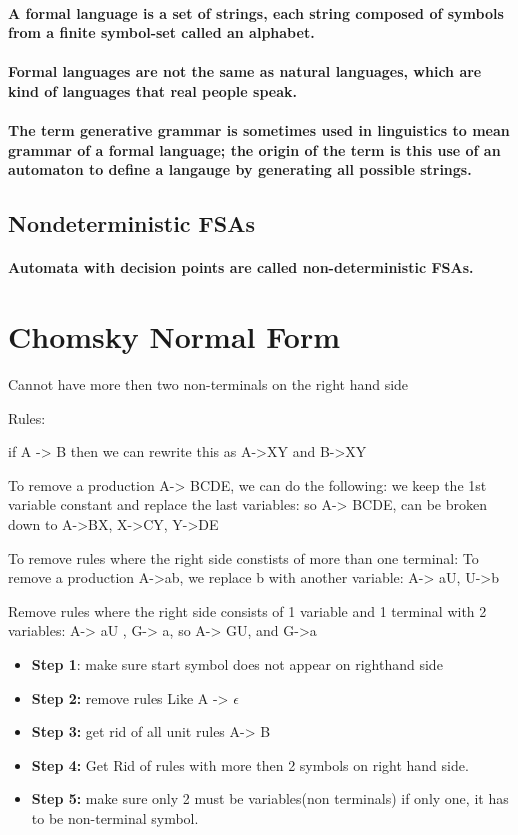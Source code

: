 \documentclass[a4paper]{article}
\begin{document}
\paragraph{A \textbf{formal language} is a set of strings, each string composed of symbols from a finite symbol-set called an \textbf{alphabet}. }
\paragraph{Formal languages are not the same as \textbf{natural languages}, which are kind of languages that real people speak. }
\paragraph{The term \textbf{generative grammar }is sometimes used in linguistics to mean grammar of a formal language; the origin of the term is this use of an automaton to define a langauge by generating all possible strings. }
\subsection{Nondeterministic FSAs}
\paragraph{Automata with decision points are called \textbf{non-deterministic FSAs}. }


\section{Chomsky Normal Form}
\par{Cannot have more then two non-terminals on the right hand side}
\par{Rules:}
\par{if A -> B then we can rewrite this as A->XY and B->XY}
\par{To remove a production A-> BCDE, we can do the following: we keep the 1st variable constant and replace the last variables: so A-> BCDE, can be broken down to A->BX, X->CY, Y->DE}
\par{To remove rules where the right side constists of more than one terminal: To remove a production A->ab, we replace b with another variable: A-> aU, U->b}
\par{Remove rules where the right side consists of 1 variable and 1 terminal with 2 variables: A-> aU , G-> a, so A-> GU, and G->a}
\begin{itemize}
\item \textbf{Step 1}: make sure start symbol does not appear on righthand side
\item \textbf{Step 2:} remove rules Like A -> $\epsilon$
\item \textbf{Step 3:} get rid of all unit rules A-> B
\item \textbf{Step 4:} Get Rid of rules with more then 2 symbols on right hand side. 
\item \textbf{Step 5:} make sure only 2 must be variables(non terminals) if only one, it has to be non-terminal symbol. 

\end{itemize}
\end{document}
